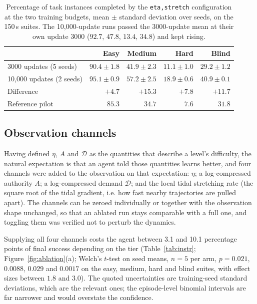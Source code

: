 \documentclass[11pt]{article}
\newcommand{\dd}{\mathcal{D}}
\newcommand{\code}[1]{\texttt{\small #1}}
\begin{document}
\begin{table}[t]
\centering
\small
\begin{tabular}{lrrrr}
\toprule
& Easy & Medium & Hard & Blind \\
\midrule
3000 updates (5 seeds)   & $90.4 \pm 1.8$ & $41.9 \pm 2.3$ & $11.1 \pm 1.0$ & $29.2 \pm 1.2$ \\
10,000 updates (2 seeds) & $95.1 \pm 0.9$ & $57.2 \pm 2.5$ & $18.9 \pm 0.6$ & $40.9 \pm 0.1$ \\
\midrule
Difference               & $+4.7$ & $+15.3$ & $+7.8$ & $+11.7$ \\
Reference pilot          & $85.3$ & $34.7$ & $7.6$ & $31.8$ \\
\bottomrule
\end{tabular}
\caption{Percentage of task instances completed by the \code{eta,stretch}
configuration at the two training budgets, mean $\pm$ standard deviation
over seeds, on the 150\,s suites. The 10,000-update runs passed the
3000-update mean at their own update 3000 ($92.7$, $47.8$, $13.4$, $34.8$)
and kept rising.}
\label{tab:budget}
\end{table}

\subsection{Observation channels}
\label{sec:instruments}

Having defined $\eta$, $A$ and $\dd$ as the quantities that describe a
level's difficulty, the natural expectation is that an agent told those
quantities learns better, and four channels were added to the observation on
that expectation: $\eta$; a log-compressed authority $A$; a log-compressed
demand $\dd$; and the local tidal stretching rate (the square root of the
tidal gradient, i.e. how fast nearby trajectories are pulled apart). The
channels can be zeroed individually or together with the observation shape
unchanged, so that an ablated run stays comparable with a full one, and
toggling them was verified not to perturb the dynamics.

Supplying all four channels costs the agent between 3.1 and 10.1 percentage
points of final success depending on the tier (Table~\ref{tab:instr};
Figure~\ref{fig:ablation}(a); Welch's $t$-test on seed means, $n = 5$ per
arm, $p = 0.021$, $0.0088$, $0.029$ and $0.0017$ on the easy, medium, hard
and blind suites, with effect sizes between $1.8$ and $3.0$). The quoted
uncertainties are training-seed standard deviations, which are the relevant
ones; the episode-level binomial intervals are far narrower and would
overstate the confidence.
\end{document}
